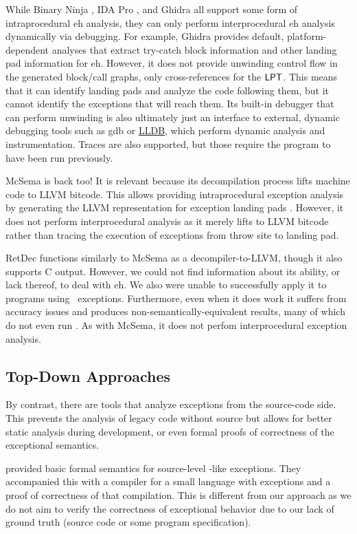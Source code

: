 While Binary Ninja \autocite{binary-ninja}, IDA Pro \autocite{ida}, and Ghidra \autocite{ghidra} all support some form of intraprocedural \ac{eh} analysis, they can only perform interprocedural \ac{eh} analysis dynamically via debugging.
For example, Ghidra provides default, platform-dependent analyses that extract try-catch block information and other landing pad information for \ac{eh}.
However, it does not provide unwinding control flow in the generated block/call graphs, only cross-references for the $\operatorname{\mathsf{LPT}}$.
This means that it can identify landing pads and analyze the code following them, but it cannot identify the exceptions that will reach them.
Its built-in debugger that can perform unwinding is also ultimately just an interface to external, dynamic debugging tools such as \ac{gdb} or \href{https://lldb.llvm.org/}{LLDB},
which perform dynamic analysis and instrumentation. Traces are also supported,
but those require the program to have been run previously.

McSema \autocite{mcsema} is back too! It is relevant because its decompilation process lifts machine code to LLVM bitcode.
This allows providing intraprocedural exception analysis by generating the LLVM representation for exception landing pads \autocite{mcsema-exceptions}.
However, it does not perform interprocedural analysis as it merely lifts to LLVM bitcode rather than tracing the execution of exceptions from throw site to landing pad.

RetDec \autocite{retdec} functions similarly to McSema as a decompiler-to-LLVM, though it also supports C output.
However, we could not find information about its ability, or lack thereof, to deal with \ac{eh}. We also were unable to successfully apply it to programs using \Cpp\ exceptions.
Furthermore, even when it does work it suffers from accuracy issues and produces non-semantically-equivalent results, many of which do not even run \autocite{foudree2019regsym}.
As with McSema, it does not perfom interprocedural exception analysis.

\subsection{Top-Down Approaches}
By contrast, there are tools that analyze exceptions from the source-code side.
This prevents the analysis of legacy code without source but allows for better static analysis during development, or even formal proofs of correctness of the exceptional semantics.

\Textcite{hutton2004compiling} provided basic formal semantics for source-level \Cpp-like exceptions.
They accompanied this with a compiler for a small language with exceptions and a proof of correctness of that compilation.
This is different from our approach as we do not aim to verify the correctness of exceptional behavior due to our lack of ground truth (source code or some program specification).

